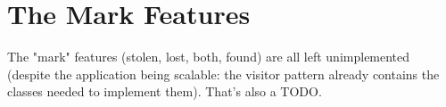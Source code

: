 \section{The Mark Features}
The "mark" features (stolen, lost, both, found) are all left unimplemented (despite the application being scalable: the visitor pattern already contains the classes needed to implement them). That's also a TODO.